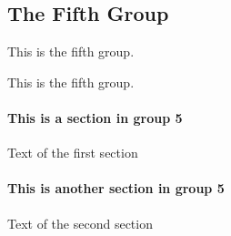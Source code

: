 \hypertarget{group__group5}{}\subsection{The Fifth Group}
\label{group__group5}


This is the fifth group.  


This is the fifth group. 

\hypertarget{mypage1}{}\paragraph{This is a section in group 5}\label{mypage1}
Text of the first section \hypertarget{mypage2}{}\paragraph{This is another section in group 5}\label{mypage2}
Text of the second section 